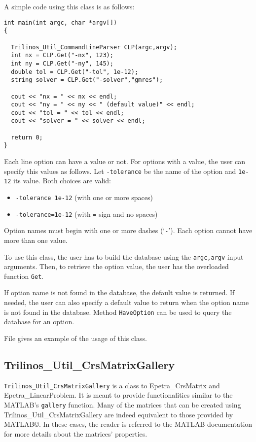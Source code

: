 A simple code using this class is as follows:
\begin{verbatim}
int main(int argc, char *argv[])
{

  Trilinos_Util_CommandLineParser CLP(argc,argv);
  int nx = CLP.Get("-nx", 123);
  int ny = CLP.Get("-ny", 145);
  double tol = CLP.Get("-tol", 1e-12);
  string solver = CLP.Get("-solver","gmres");

  cout << "nx = " << nx << endl;
  cout << "ny = " << ny << " (default value)" << endl;
  cout << "tol = " << tol << endl;
  cout << "solver = " << solver << endl;

  return 0;
}
\end{verbatim}

Each line   option can have a value or not. For options with a value,
the user can specify this values as follows. Let \verb!-tolerance! be the
name of the option and \verb!1e-12! its value. Both choices are valid:
\begin{itemize}
\item \verb!-tolerance 1e-12! (with one or more spaces)
\item \verb!-tolerance=1e-12! (with \verb!=! sign and no spaces)
\end{itemize}

Option names must begin with one or more dashes (`\verb!-!'). Each option
cannot have more than one value.

To use this class, the user has to build the database using the
\verb!argc,argv! input arguments. Then, to retrieve the option value,
the user has the overloaded function \verb!Get!.
 
If option name is not found in the database, the default value is
returned. If needed, the user can also specify a default value to return
when the option name is not found in the database. Method
\verb!HaveOption! can be used to query the database for an option.

File  gives an example of the usage of this class.
 

\subsection{Trilinos\_Util\_CrsMatrixGallery}
\label{sec:triutils:gallery}

\verb!Trilinos_Util_CrsMatrixGallery! is a class to Epetra\_CrsMatrix
and Epetra\_LinearProblem. It is meant to provide functionalities
similar to the MATLAB's \verb!gallery! function. Many of the matrices
that can be created using Trilinos\_Util\_CrsMatrixGallery are indeed
equivalent to those provided by MATLAB\copyright. In these cases, the
reader is referred to the MATLAB documentation for more details about
the matrices' properties. 

